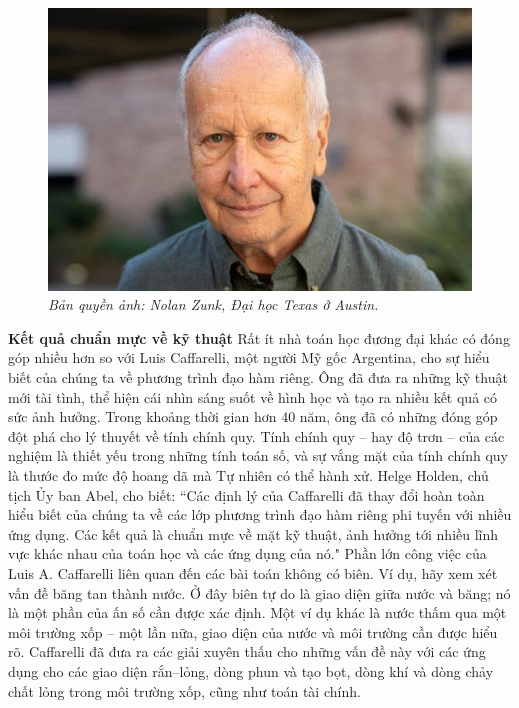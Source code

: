 \begin{multicols}{2}
	\begin{figure}[H]
		\vspace*{-5pt}
		\centering
		\captionsetup{labelformat= empty, justification=centering}
		\includegraphics[width= 1\linewidth]{2}
		\caption{\small\textit{\color{doisongtoanhoc}Bản quyền ảnh: Nolan Zunk, Đại học Texas ở Austin.}}
		\vspace*{-10pt}
	\end{figure}
	\textbf{\color{doisongtoanhoc}Kết quả chuẩn mực về kỹ thuật}
	\vskip 0.1cm
	Rất ít nhà toán học đương đại khác có đóng góp nhiều hơn so với Luis Caffarelli, một người Mỹ gốc Argentina, cho sự hiểu biết của chúng ta về phương trình đạo hàm riêng. Ông đã đưa ra những kỹ thuật mới tài tình, thể hiện cái nhìn sáng suốt về hình học và tạo ra nhiều kết quả có sức ảnh hưởng. Trong khoảng thời gian hơn $40$ năm, ông đã có những đóng góp đột phá cho lý thuyết về tính chính quy. Tính chính quy -- hay độ trơn -- của các nghiệm là thiết yếu trong những tính toán số, và sự vắng mặt của tính chính quy là thước đo mức độ hoang dã mà Tự nhiên có thể hành xử.
	\vskip 0.1cm
	Helge Holden, chủ tịch Ủy ban Abel, cho biết: ``Các định lý của Caffarelli đã thay đổi hoàn toàn hiểu biết của chúng ta về các lớp phương trình đạo hàm riêng phi tuyến với nhiều ứng dụng. Các kết quả là chuẩn mực về mặt kỹ thuật, ảnh hưởng tới nhiều lĩnh vực khác nhau của toán học và các ứng dụng của nó." 
	\vskip 0.1cm
	Phần lớn công việc của Luis A. Caffarelli liên quan đến các bài toán không có biên.  Ví dụ, hãy xem xét vấn đề băng tan thành nước. Ở đây biên tự do là giao diện giữa nước và băng; nó là một phần của ấn số cần được xác định. Một ví dụ khác là nước thấm qua một môi trường xốp -- một lần nữa, giao diện của nước và môi trường cần được hiểu rõ. Caffarelli đã đưa ra các giải xuyên thấu cho những vấn đề này với các ứng dụng cho các giao diện rắn--lỏng, dòng phun và tạo bọt, dòng khí và dòng chảy chất lỏng trong môi trường xốp, cũng như toán tài chính.

\end{multicols}
